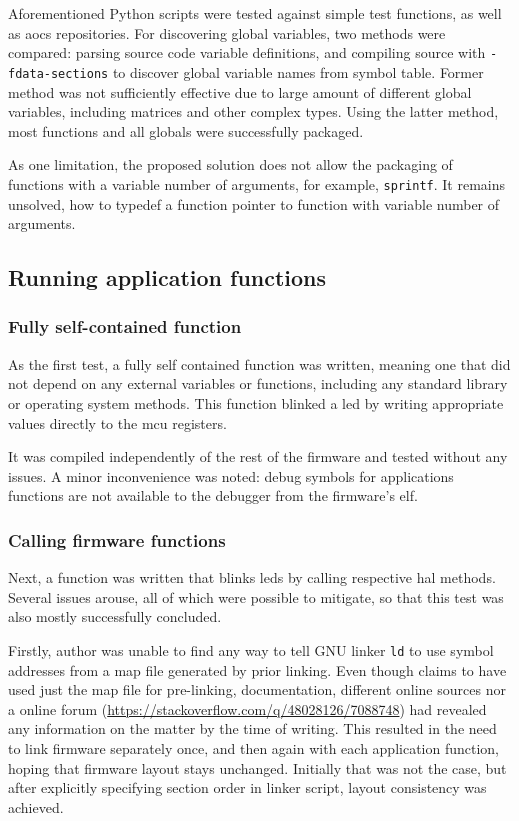 Aforementioned Python scripts were tested against simple test functions, as well as \gls{aocs} repositories. For discovering global variables, two methods were compared: parsing source code variable definitions, and compiling source with \texttt{-fdata-sections} to discover global variable names from symbol table. Former method was not sufficiently effective due to large amount of different global variables, including matrices and other complex types. Using the latter method, most functions and all globals were successfully packaged.

As one limitation, the proposed solution does not allow the packaging of functions with a variable number of arguments, for example, \texttt{sprintf}. It remains unsolved, how to typedef a function pointer to function with variable number of arguments.

\subsection{Running application functions}

\subsubsection{Fully self-contained function}

As the first test, a fully self contained function was written, meaning one that did not depend on any external variables or functions, including any standard library or operating system methods. This function blinked a \gls{led} by writing appropriate values directly to the \gls{mcu} registers.

It was compiled independently of the rest of the firmware and tested without any issues. A minor inconvenience was noted: debug symbols for applications functions are not available to the debugger from the firmware's \gls{elf}.

\subsubsection{Calling firmware functions}

Next, a function was written that blinks \glspl{led} by calling respective \gls{hal} methods. Several issues arouse, all of which were possible to mitigate, so that this test was also mostly successfully concluded.

Firstly, author was unable to find any way to tell GNU linker \texttt{ld} to use symbol addresses from a map file generated by prior linking. Even though \textcite{Dunkels2006} claims to have used just the map file for pre-linking, documentation, different online sources nor a online forum (\url{https://stackoverflow.com/q/48028126/7088748}) had revealed any information on the matter by the time of writing. This resulted in the need to link firmware separately once, and then again with each application function, hoping that firmware layout stays unchanged. Initially that was not the case, but after explicitly specifying section order in linker script, layout consistency was achieved.


